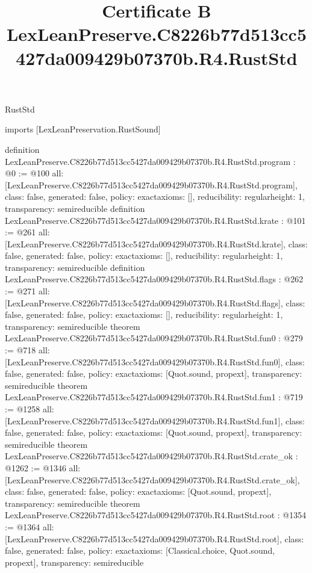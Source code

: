 \begin{lexlean}{RustStd}
\title{Certificate B LexLeanPreserve.C8226b77d513cc5427da009429b07370b.R4.RustStd}
\begin{coremodule}
imports [LexLeanPreservation.RustSound]

definition LexLeanPreserve.C8226b77d513cc5427da009429b07370b.R4.RustStd.program : @0 := @100 {
  all: [LexLeanPreserve.C8226b77d513cc5427da009429b07370b.R4.RustStd.program],
  class: false,
  generated: false,
  policy: exact{axioms: []},
  reducibility: regular{height: 1},
  transparency: semireducible
}
definition LexLeanPreserve.C8226b77d513cc5427da009429b07370b.R4.RustStd.krate : @101 := @261 {
  all: [LexLeanPreserve.C8226b77d513cc5427da009429b07370b.R4.RustStd.krate],
  class: false,
  generated: false,
  policy: exact{axioms: []},
  reducibility: regular{height: 1},
  transparency: semireducible
}
definition LexLeanPreserve.C8226b77d513cc5427da009429b07370b.R4.RustStd.flags : @262 := @271 {
  all: [LexLeanPreserve.C8226b77d513cc5427da009429b07370b.R4.RustStd.flags],
  class: false,
  generated: false,
  policy: exact{axioms: []},
  reducibility: regular{height: 1},
  transparency: semireducible
}
theorem LexLeanPreserve.C8226b77d513cc5427da009429b07370b.R4.RustStd.fun0 : @279 := @718 {
  all: [LexLeanPreserve.C8226b77d513cc5427da009429b07370b.R4.RustStd.fun0],
  class: false,
  generated: false,
  policy: exact{axioms: [Quot.sound, propext]},
  transparency: semireducible
}
theorem LexLeanPreserve.C8226b77d513cc5427da009429b07370b.R4.RustStd.fun1 : @719 := @1258 {
  all: [LexLeanPreserve.C8226b77d513cc5427da009429b07370b.R4.RustStd.fun1],
  class: false,
  generated: false,
  policy: exact{axioms: [Quot.sound, propext]},
  transparency: semireducible
}
theorem LexLeanPreserve.C8226b77d513cc5427da009429b07370b.R4.RustStd.crate_ok : @1262 := @1346 {
  all: [LexLeanPreserve.C8226b77d513cc5427da009429b07370b.R4.RustStd.crate_ok],
  class: false,
  generated: false,
  policy: exact{axioms: [Quot.sound, propext]},
  transparency: semireducible
}
theorem LexLeanPreserve.C8226b77d513cc5427da009429b07370b.R4.RustStd.root : @1354 := @1364 {
  all: [LexLeanPreserve.C8226b77d513cc5427da009429b07370b.R4.RustStd.root],
  class: false,
  generated: false,
  policy: exact{axioms: [Classical.choice, Quot.sound, propext]},
  transparency: semireducible
}


\end{coremodule}
\end{lexlean}
